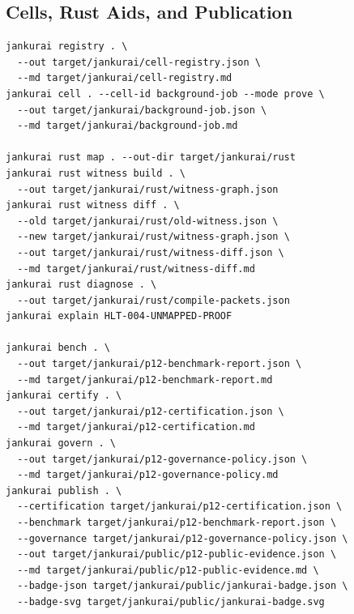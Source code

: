 \subsection{Cells, Rust Aids, and Publication}

\begin{lstlisting}[style=codebox]
jankurai registry . \
  --out target/jankurai/cell-registry.json \
  --md target/jankurai/cell-registry.md
jankurai cell . --cell-id background-job --mode prove \
  --out target/jankurai/background-job.json \
  --md target/jankurai/background-job.md

jankurai rust map . --out-dir target/jankurai/rust
jankurai rust witness build . \
  --out target/jankurai/rust/witness-graph.json
jankurai rust witness diff . \
  --old target/jankurai/rust/old-witness.json \
  --new target/jankurai/rust/witness-graph.json \
  --out target/jankurai/rust/witness-diff.json \
  --md target/jankurai/rust/witness-diff.md
jankurai rust diagnose . \
  --out target/jankurai/rust/compile-packets.json
jankurai explain HLT-004-UNMAPPED-PROOF

jankurai bench . \
  --out target/jankurai/p12-benchmark-report.json \
  --md target/jankurai/p12-benchmark-report.md
jankurai certify . \
  --out target/jankurai/p12-certification.json \
  --md target/jankurai/p12-certification.md
jankurai govern . \
  --out target/jankurai/p12-governance-policy.json \
  --md target/jankurai/p12-governance-policy.md
jankurai publish . \
  --certification target/jankurai/p12-certification.json \
  --benchmark target/jankurai/p12-benchmark-report.json \
  --governance target/jankurai/p12-governance-policy.json \
  --out target/jankurai/public/p12-public-evidence.json \
  --md target/jankurai/public/p12-public-evidence.md \
  --badge-json target/jankurai/public/jankurai-badge.json \
  --badge-svg target/jankurai/public/jankurai-badge.svg
\end{lstlisting}
